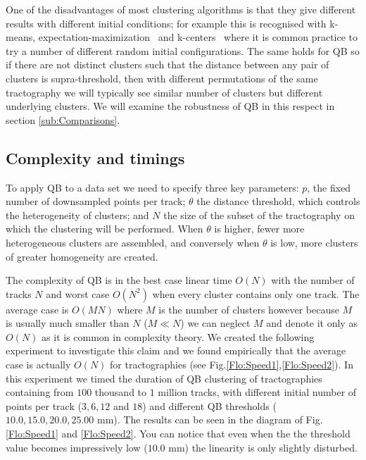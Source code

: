 \documentclass[preprint,authoryear,a4paper,10pt,onecolumn]{elsarticle}
\begin{document}
One of the disadvantages of most clustering algorithms is that they give
different results with different initial conditions; for example this is
recognised with k-means,
expectation-maximization~\citep{dempster1977maximum} and
k-centers~\citep{gonzalez1985clustering} where it is common practice to
try a number of different random initial configurations. The same holds
for QB so if there are not distinct clusters such that the distance
between any pair of clusters is supra-threshold, then with different
permutations of the same tractography we will typically see similar
number of clusters but different underlying clusters. We will examine
the robustness of QB in this respect in section \ref{sub:Comparisons}.

\subsection{Complexity and timings\label{sub:Complexity}}

To apply QB to a data set we need to specify three key parameters:
$p$, the fixed number of downsampled points per track; $\theta$
the distance threshold, which controls the heterogeneity of clusters;
and $N$ the size of the subset of the tractography on which the clustering
will be performed. When $\theta$ is higher, fewer more heterogeneous
clusters are assembled, and conversely when $\theta$ is low, more
clusters of greater homogeneity are created.

The complexity of QB is in the best case linear time $O(N)$ with
the number of tracks $N$ and worst case $O(N^{2})$ when every cluster
contains only one track. The average case is $O(MN)$ where $M$ is
the number of clusters however because $M$ is usually much smaller
than $N$ ($M\ll N$) we can neglect $M$ and denote it only as $O(N)$
as it is common in complexity theory. We created the following experiment
to investigate this claim and we found empirically that the average
case is actually $O(N)$ for tractographies (see Fig.\ref{Flo:Speed1},\ref{Flo:Speed2}).
In this experiment we timed the duration of QB clustering of tractographies
containing from $100$ thousand to $1$ million tracks, with different
initial number of points per track ($3,6,12$ and $18$) and different
QB thresholds ($10.0,15.0,20.0,25.00$ mm). The results can be seen
in the diagram of Fig.\ref{Flo:Speed1} and \ref{Flo:Speed2}. You
can notice that even when the the threshold value becomes impressively
low ($10.0$ mm) the linearity is only slightly disturbed.
\end{document}
